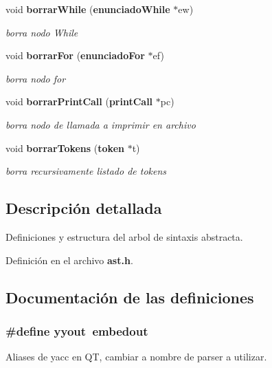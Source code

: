 \begin{CompactItemize}
void {\bf borrar\-While} ({\bf enunciado\-While} $\ast$ew)
\begin{CompactList}\small\item\em borra nodo While \item\end{CompactList}\item 
void {\bf borrar\-For} ({\bf enunciado\-For} $\ast$ef)
\begin{CompactList}\small\item\em borra nodo for \item\end{CompactList}\item 
void {\bf borrar\-Print\-Call} ({\bf print\-Call} $\ast$pc)
\begin{CompactList}\small\item\em borra nodo de llamada a imprimir en archivo \item\end{CompactList}\item 
void {\bf borrar\-Tokens} ({\bf token} $\ast$t)
\begin{CompactList}\small\item\em borra recursivamente listado de tokens \item\end{CompactList}\end{CompactItemize}


\subsection{Descripci\'{o}n detallada}
Definiciones y estructura del arbol de sintaxis abstracta. 



Definici\'{o}n en el archivo {\bf ast.h}.

\subsection{Documentaci\'{o}n de las definiciones}
\subsubsection{\setlength{\rightskip}{0pt plus 5cm}\#define {\bf yyout}~embedout}\label{ast_8h_a0}


Aliases de yacc en QT, cambiar a nombre de parser a utilizar. 



